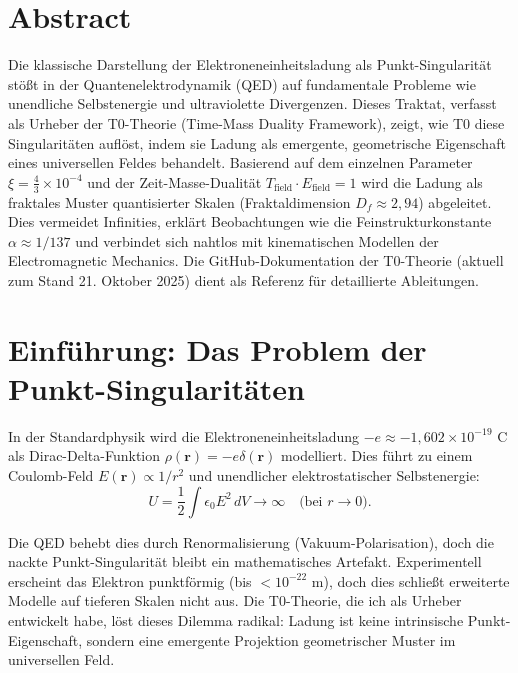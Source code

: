 \section*{Abstract}
		Die klassische Darstellung der Elektroneneinheitsladung als Punkt-Singularität stößt in der Quantenelektrodynamik (QED) auf fundamentale Probleme wie unendliche Selbstenergie und ultraviolette Divergenzen. Dieses Traktat, verfasst als Urheber der T0-Theorie (Time-Mass Duality Framework), zeigt, wie T0 diese Singularitäten auflöst, indem sie Ladung als emergente, geometrische Eigenschaft eines universellen Feldes behandelt. Basierend auf dem einzelnen Parameter $\xi = \frac{4}{3} \times 10^{-4}$ und der Zeit-Masse-Dualität $T_{\text{field}} \cdot E_{\text{field}} = 1$ wird die Ladung als fraktales Muster quantisierter Skalen (Fraktaldimension $D_f \approx 2{,}94$) abgeleitet. Dies vermeidet Infinities, erklärt Beobachtungen wie die Feinstrukturkonstante $\alpha \approx 1/137$ und verbindet sich nahtlos mit kinematischen Modellen der Electromagnetic Mechanics. Die GitHub-Dokumentation der T0-Theorie (aktuell zum Stand 21. Oktober 2025) dient als Referenz für detaillierte Ableitungen.

	
	
	\section{Einführung: Das Problem der Punkt-Singularitäten}
	\label{sec:intro}
	
	In der Standardphysik wird die Elektroneneinheitsladung $-e \approx -1{,}602 \times 10^{-19}$ C als Dirac-Delta-Funktion $\rho(\mathbf{r}) = -e \delta(\mathbf{r})$ modelliert. Dies führt zu einem Coulomb-Feld $E(\mathbf{r}) \propto 1/r^2$ und unendlicher elektrostatischer Selbstenergie:
	\begin{equation}
		U = \frac{1}{2} \int \epsilon_0 E^2 \, dV \to \infty \quad \text{(bei $r \to 0$)}.
	\end{equation}
	
	Die QED behebt dies durch Renormalisierung (Vakuum-Polarisation), doch die nackte Punkt-Singularität bleibt ein mathematisches Artefakt. Experimentell erscheint das Elektron punktförmig (bis $< 10^{-22}$ m), doch dies schließt erweiterte Modelle auf tieferen Skalen nicht aus. Die T0-Theorie, die ich als Urheber entwickelt habe, löst dieses Dilemma radikal: Ladung ist keine intrinsische Punkt-Eigenschaft, sondern eine emergente Projektion geometrischer Muster im universellen Feld.
	

